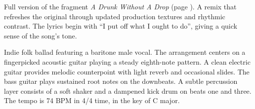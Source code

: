 
\label{sec:a-drunk-without-a-drop-remix}

\begin{notes}
Full version of the fragment \emph{A Drunk Without A Drop} (page \pageref{sec:a-drunk-without-a-drop}). A remix that refreshes the original through updated production textures and rhythmic contrast. %
The lyrics begin with “I put off what I ought to do”, giving a quick sense of the song’s tone.
\end{notes}

\begin{style}
Indie folk ballad featuring a baritone male vocal. %
The arrangement centers on a fingerpicked acoustic guitar playing a steady eighth-note pattern. %
A clean electric guitar provides melodic counterpoint with light reverb and occasional slides. %
The bass guitar plays sustained root notes on the downbeats. %
A subtle percussion layer consists of a soft shaker and a dampened kick drum on beats one and three. %
The tempo is 74 BPM in 4/4 time, in the key of C major.
\end{style}

